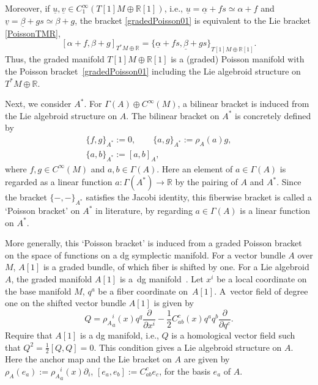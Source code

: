 \documentclass[10pt,a4paper]{amsart}
\numberwithin{equation}{section}
\def\bR{{\mathbb{R}}}
\newcommand{\sbv}[2]{{\{{{#1},{#2}}\}}}
\newcommand{\rhoa}{{\rho_A}}
\newcommand{\uu}{{\underline{u}}{}}
\newcommand{\uv}{{\underline{v}}{}}
\newcommand{\ualpha}{{\underline{\alpha}}{}}
\newcommand{\ubeta}{{\underline{\beta}}{}}
\begin{document}
Moreover, if
$\uu, \uv \in C_1^{\infty}(T[1]M \oplus \bR[1])$, i.e.,
$\uu = \ualpha + fs \simeq \alpha + f$ and
$\uv = \ubeta + g s \simeq \beta + g$,
the bracket \eqref{gradedPoisson01} is equivalent to
the Lie bracket \eqref{PoissonTMR},
\[
[\alpha + f, \beta + g]_{T^*M \oplus \bR}
=
\sbv{\ualpha + fs}{\ubeta + g s }_{T[1]M \oplus \bR[1]}.
\]
Thus, the graded manifold $T[1]M \oplus \bR[1]$ is a (graded)
Poisson manifold with the Poisson bracket~\eqref{gradedPoisson01}
including the Lie algebroid structure on $T^*M \oplus \bR$.


Next, we consider $A^*$.
For $\Gamma(A) \oplus C^{\infty}(M)$, a bilinear bracket is induced
from the Lie algebroid structure on $A$.
The bilinear bracket on $A^*$ is concretely defined by
\cite{Blohmann:2023}
\begin{gather}%
\{f, g \}_{A^*} := 0,
\label{PoissonA01}
\qquad
\{a, g \}_{A^*} := \rhoa(a) g,
\\
\{a, b \}_{A^*} := [a, b]_A,
\label{PoissonA03}
\end{gather}
where $f, g \in C^{\infty}(M)$ and $a, b \in \Gamma(A)$.
Here an element of $a \in \Gamma(A)$ is regarded as a
linear function $a\colon \Gamma(A^*) \rightarrow \bR$
by the pairing of $A$ and $A^*$.
Since the bracket $\{-, -\}_{A^*}$ satisfies the Jacobi identity,
this fiberwise bracket is called a `Poisson bracket' on $A^*$
in literature, by regarding $a \in \Gamma(A)$ is a linear function
on $A^*$.


More generally, this `Poisson bracket'
is induced from a graded Poisson bracket
on the space of functions on a dg symplectic manifold.
For a vector bundle $A$ over $M$, $A[1]$ is a graded bundle,
of which fiber is shifted by one.
For a Lie algebroid $A$, the graded manifold $A[1]$ is
a~dg manifold~\cite{Vaintrob}.
Let $x^i$ be a local coordinate on the base manifold $M$,
$q^a$ be a fiber coordinate on~$A[1]$.
A~vector field of degree one on the shifted vector bundle
$A[1]$ is given by
\[
Q = \rhoa^i_a(x) q^q \frac{\partial}{\partial x^i}
- \frac{1}{2} C_{ab}^c(x) q^a q^b \frac{\partial}{\partial q^c}.
\]
Require that $A[1]$ is a dg manifold, i.e., $Q$ is a homological vector field
such that $Q^2 = \frac{1}{2} [Q, Q]\allowbreak =0$.
This condition gives a Lie algebroid structure on $A$.
Here the anchor map and the Lie bracket on $A$ are given by
$
\rhoa(e_a) := \rhoa^i_a(x) \partial_i$,
$
[e_a, e_b] := C_{ab}^c e_c$,
for the basis $e_a$ of $A$.
\end{document}
